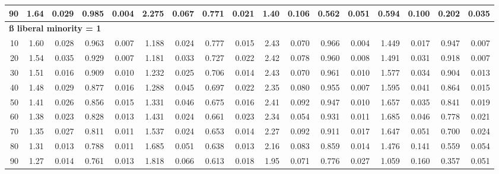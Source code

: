 \documentclass[
]{article}
\begin{document}
\begin{table}[H]
{\begin{tabular}{r|r|r|r|r|r|r|r|r|r|r|r|r|r|r|r|r}
\hline
\hspace{1em}90 & 1.64 & 0.029 & 0.985 & 0.004 & 2.275 & 0.067 & 0.771 & 0.021 & 1.40 & 0.106 & 0.562 & 0.051 & 0.594 & 0.100 & 0.202 & 0.035\\
\hline
\multicolumn{17}{l}{\textbf{ß liberal minority = 1}}\\
\hline
\hspace{1em}10 & 1.60 & 0.028 & 0.963 & 0.007 & 1.188 & 0.024 & 0.777 & 0.015 & 2.43 & 0.070 & 0.966 & 0.004 & 1.449 & 0.017 & 0.947 & 0.007\\
\hline
\hspace{1em}20 & 1.54 & 0.035 & 0.929 & 0.007 & 1.181 & 0.033 & 0.727 & 0.022 & 2.42 & 0.078 & 0.960 & 0.008 & 1.491 & 0.031 & 0.918 & 0.007\\
\hline
\hspace{1em}30 & 1.51 & 0.016 & 0.909 & 0.010 & 1.232 & 0.025 & 0.706 & 0.014 & 2.43 & 0.070 & 0.961 & 0.010 & 1.577 & 0.034 & 0.904 & 0.013\\
\hline
\hspace{1em}40 & 1.48 & 0.029 & 0.877 & 0.016 & 1.288 & 0.045 & 0.697 & 0.022 & 2.35 & 0.080 & 0.955 & 0.007 & 1.595 & 0.041 & 0.864 & 0.015\\
\hline
\hspace{1em}50 & 1.41 & 0.026 & 0.856 & 0.015 & 1.331 & 0.046 & 0.675 & 0.016 & 2.41 & 0.092 & 0.947 & 0.010 & 1.657 & 0.035 & 0.841 & 0.019\\
\hline
\hspace{1em}60 & 1.38 & 0.023 & 0.828 & 0.013 & 1.431 & 0.024 & 0.661 & 0.023 & 2.34 & 0.054 & 0.931 & 0.011 & 1.685 & 0.046 & 0.778 & 0.021\\
\hline
\hspace{1em}70 & 1.35 & 0.027 & 0.811 & 0.011 & 1.537 & 0.024 & 0.653 & 0.014 & 2.27 & 0.092 & 0.911 & 0.017 & 1.647 & 0.051 & 0.700 & 0.024\\
\hline
\hspace{1em}80 & 1.31 & 0.013 & 0.788 & 0.011 & 1.685 & 0.051 & 0.638 & 0.013 & 2.16 & 0.083 & 0.859 & 0.014 & 1.476 & 0.141 & 0.559 & 0.054\\
\hline
\hspace{1em}90 & 1.27 & 0.014 & 0.761 & 0.013 & 1.818 & 0.066 & 0.613 & 0.018 & 1.95 & 0.071 & 0.776 & 0.027 & 1.059 & 0.160 & 0.357 & 0.051\\
\hline
\end{tabular}}\begin{table}
\centering
{}
\end{table}
\end{table}
\end{document}
